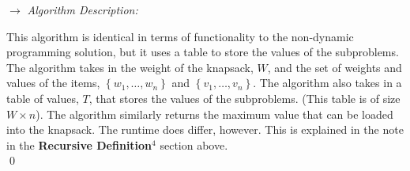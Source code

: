 \documentclass{report}
\begin{document}
\begin{enumerate}
\begin{algorithm}
          \DontPrintSemicolon
          \caption{Finding the optimal solution to the unbounded 0-1 Knapsack problem with dynamic programming.}
           

              
        \end{algorithm}

        $\to$ \emph{Algorithm Description:}

        This algorithm is identical in terms of functionality to the non-dynamic programming solution, but it uses a table to store the values of the subproblems. The algorithm takes in the weight of the knapsack, $W$, and the set of weights and values of the items, $\left\{w_1, \ldots, w_n\right\}$ and $\left\{v_1, \ldots, v_n\right\}$. The algorithm also takes in a table of values, $T$, that stores the values of the subproblems. (This table is of size $W \times n$). The algorithm similarly returns the maximum value that can be loaded into the knapsack. The runtime does differ, however. This is explained in the note in the \textbf{Recursive Definition$^4$} section above.\\

        \qed

    \end{enumerate}
\end{document}
